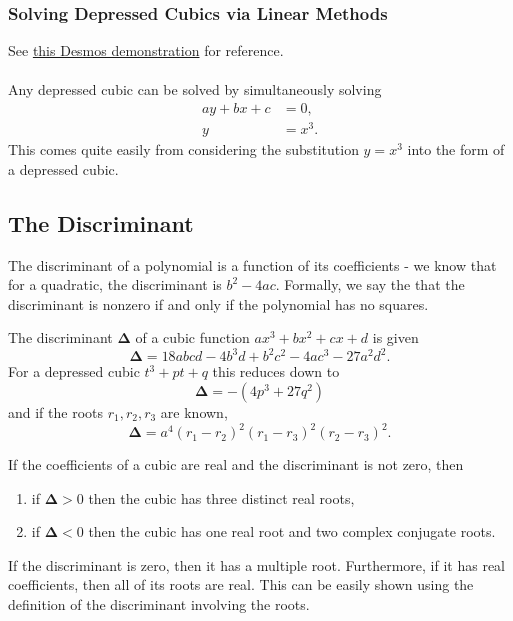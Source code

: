 \documentclass[12pt]{article}
\begin{document}
\subsubsection{Solving Depressed Cubics via Linear Methods}
See \href{https://www.desmos.com/calculator/xkcdxf7sy2}{this Desmos demonstration} for reference.\\\\
Any depressed cubic can be solved by simultaneously solving
\begin{align*}
    ay + bx + c &= 0,\\
    y &= x^3.
\end{align*}
This comes quite easily from considering the substitution $y = x^3$ into the form of a depressed cubic.

\subsection{The Discriminant}
The discriminant of a polynomial is a function of its coefficients - we know that for a quadratic, the discriminant is $b^2 - 4ac$. Formally, we say the that the discriminant is nonzero if and only if the polynomial has no squares.
\begin{dfn}
The discriminant $\mathbf{\Delta}$ of a cubic function $ax^3 + bx^2 + cx + d$ is given
\begin{equation*}
    \mathbf{\Delta} = 18abcd - 4b^3d + b^2c^2 - 4ac^3 - 27a^2d^2.
\end{equation*}
For a depressed cubic $t^3 + pt + q$ this reduces down to
\begin{equation*}
    \mathbf{\Delta} = -(4p^3 + 27q^2)
\end{equation*}
and if the roots $r_1, r_2, r_3$ are known,
\begin{equation*}
    \mathbf{\Delta} = a^4(r_1 - r_2)^2(r_1 - r_3)^2(r_2 - r_3)^2.
\end{equation*}
\end{dfn}
If the coefficients of a cubic are real and the discriminant is not zero, then
\begin{enumerate}[itemsep=-2mm]
    \item if $\mathbf{\Delta} > 0$ then the cubic has three distinct real roots,
    \item if $\mathbf{\Delta} < 0$ then the cubic has one real root and two complex conjugate roots.
\end{enumerate}
If the discriminant is zero, then it has a multiple root. Furthermore, if it has real coefficients, then all of its roots are real. This can be easily shown using the definition of the discriminant involving the roots.
\end{document}
